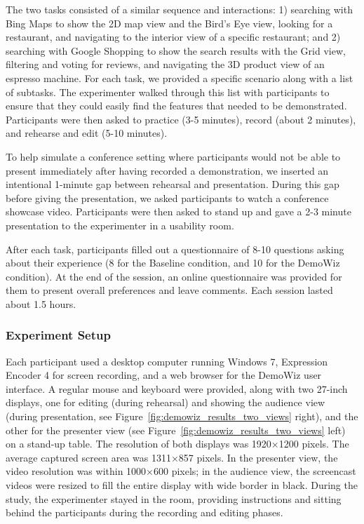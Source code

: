 The two tasks consisted of a similar sequence and interactions: 1) searching with Bing Maps to show the 2D map view and the Bird's Eye view, looking for a restaurant, and navigating to the interior view of a specific restaurant; and 2) searching with Google Shopping to show the search results with the Grid view, filtering and voting for reviews, and navigating the 3D product view of an espresso machine. For each task, we provided a specific scenario along with a list of subtasks. The experimenter walked through this list with participants to ensure that they could easily find the features that needed to be demonstrated. Participants were then asked to practice (3-5 minutes), record (about 2 minutes), and rehearse and edit (5-10 minutes).

To help simulate a conference setting where participants would not be able to present immediately after having recorded a demonstration, we inserted an intentional 1-minute gap between rehearsal and presentation. During this gap before giving the presentation, we asked participants to watch a conference showcase video. Participants were then asked to stand up and gave a 2-3 minute presentation to the experimenter in a usability room.

After each task, participants filled out a questionnaire of 8-10 questions asking about their experience (8 for the Baseline condition, and 10 for the DemoWiz condition). At the end of the session, an online questionnaire was provided for them to present overall preferences and leave comments. Each session lasted about 1.5 hours.

\subsubsection{Experiment Setup}
Each participant used a desktop computer running Windows 7, Expression Encoder 4 for screen recording, and a web browser for the DemoWiz user interface. A regular mouse and keyboard were provided, along with two 27-inch displays, one for editing (during rehearsal) and showing the audience view (during presentation, see Figure~\ref{fig:demowiz_results_two_views} right), and the other for the presenter view (see Figure~\ref{fig:demowiz_results_two_views} left) on a stand-up table. The resolution of both displays was 1920×1200 pixels. The average captured screen area was 1311×857 pixels. In the presenter view, the video resolution was within 1000×600 pixels; in the audience view, the screencast videos were resized to fill the entire display with wide border in black. During the study, the experimenter stayed in the room, providing instructions and sitting behind the participants during the recording and editing phases.

